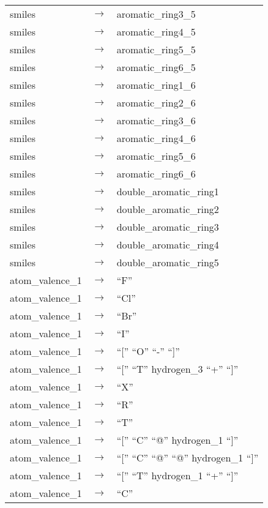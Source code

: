\documentclass[../Document.tex]{subfiles}
\begin{document}
\begin{longtable}{m{} p{} p{}}
    smiles & $\rightarrow$ & aromatic\_ring3\_5 \\
    smiles & $\rightarrow$ & aromatic\_ring4\_5 \\
    smiles & $\rightarrow$ & aromatic\_ring5\_5 \\
    smiles & $\rightarrow$ & aromatic\_ring6\_5 \\
    smiles & $\rightarrow$ & aromatic\_ring1\_6 \\
    smiles & $\rightarrow$ & aromatic\_ring2\_6 \\
    smiles & $\rightarrow$ & aromatic\_ring3\_6 \\
    smiles & $\rightarrow$ & aromatic\_ring4\_6 \\
    smiles & $\rightarrow$ & aromatic\_ring5\_6 \\
    smiles & $\rightarrow$ & aromatic\_ring6\_6 \\
    smiles & $\rightarrow$ & double\_aromatic\_ring1 \\
    smiles & $\rightarrow$ & double\_aromatic\_ring2 \\
    smiles & $\rightarrow$ & double\_aromatic\_ring3 \\
    smiles & $\rightarrow$ & double\_aromatic\_ring4 \\
    smiles & $\rightarrow$ & double\_aromatic\_ring5 \\
    atom\_valence\_1 & $\rightarrow$ & ``F'' \\
    atom\_valence\_1 & $\rightarrow$ & ``Cl'' \\
    atom\_valence\_1 & $\rightarrow$ & ``Br'' \\
    atom\_valence\_1 & $\rightarrow$ & ``I'' \\
    atom\_valence\_1 & $\rightarrow$ & ``['' ``O'' ``-'' ``]'' \\
    atom\_valence\_1 & $\rightarrow$ & ``['' ``T'' hydrogen\_3 ``+'' ``]'' \\
    atom\_valence\_1 & $\rightarrow$ & ``X'' \\
    atom\_valence\_1 & $\rightarrow$ & ``R'' \\
    atom\_valence\_1 & $\rightarrow$ & ``T'' \\
    atom\_valence\_1 & $\rightarrow$ & ``['' ``C'' ``@'' hydrogen\_1 ``]'' \\
    atom\_valence\_1 & $\rightarrow$ & ``['' ``C'' ``@'' ``@'' hydrogen\_1 ``]'' \\
    atom\_valence\_1 & $\rightarrow$ & ``['' ``T'' hydrogen\_1 ``+'' ``]'' \\
    atom\_valence\_1 & $\rightarrow$ & ``C'' \\

\end{longtable}
\end{document}
